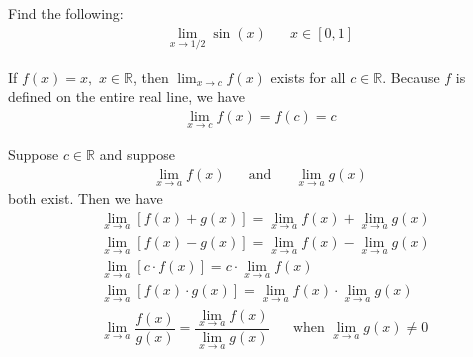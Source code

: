 \begin{exercise}
Find the following:
\begin{align*}
    \lim_{x \longrightarrow 1/2} \sin(x) \hspace{20pt} x \in [0, 1]
\end{align*}
\end{exercise}

\begin{theorem}
If $f(x) = x, \hspace{4pt} x \in \mathbb{R}$, then $\lim_{x \longrightarrow c} f(x)$ exists for all $c \in \mathbb{R}$. Because $f$ is defined on the entire real line, we have 
\begin{align*}
    \lim_{x \longrightarrow c} f(x) = f(c) = c
\end{align*}
\label{limit_identity_function}
\end{theorem}

\begin{theorem}
Suppose $c \in \mathbb{R}$ and suppose 
\begin{align*}
    \lim_{x \longrightarrow a} f(x) \hspace{20pt} \text{and} \hspace{20pt} \lim_{x \longrightarrow a} g(x)
\end{align*}
both exist. Then we have
\begin{align*}
    &\lim_{x \longrightarrow a} [f(x) + g(x)] = \lim_{x \longrightarrow a} f(x) + \lim_{x \longrightarrow a} g(x)\\[2ex]
    &\lim_{x \longrightarrow a} [f(x) - g(x)] = \lim_{x \longrightarrow a} f(x) - \lim_{x \longrightarrow a} g(x)\\[2ex]
    &\lim_{x \longrightarrow a} [c \cdot f(x)] = c \cdot \lim_{x \longrightarrow a} f(x)\\[2ex]
    &\lim_{x \longrightarrow a} [f(x) \cdot g(x)] = \lim_{x \longrightarrow a} f(x) \cdot \lim_{x \longrightarrow a} g(x)\\[2ex]
    &\lim_{x \longrightarrow a} \dfrac{f(x)}{g(x)} = \dfrac{\lim_{x \longrightarrow a} f(x)}{\lim_{x \longrightarrow a} g(x)} \hspace{20pt} \text{when} \hspace{4pt} \lim_{x \longrightarrow a} g(x) \neq 0
\end{align*}
\label{properties_limit_functions}
\end{theorem}

